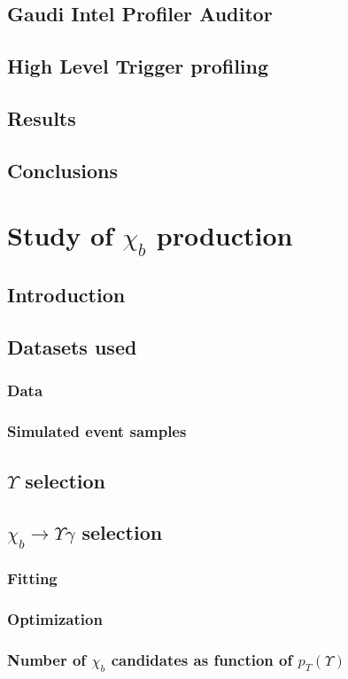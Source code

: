 \documentclass[12pt,a4paper]{report}
\begin{document}
\section{Gaudi Intel Profiler Auditor}
\section{High Level Trigger profiling}
\section{Results}
\section{Conclusions}

\chapter{Study of $\chi_{b}$ production}
\section{Introduction}
\section{Datasets used}
\subsection{Data}
\subsection{Simulated event samples}
\section{$\Upsilon$ selection}
\section{$\chi_{b} \rightarrow \Upsilon \gamma$ selection}
\subsection{Fitting}
\subsection{Optimization}
\subsection{Number of $\chi_{b}$ candidates as function of $p_{T} (\Upsilon)$}
\end{document}
